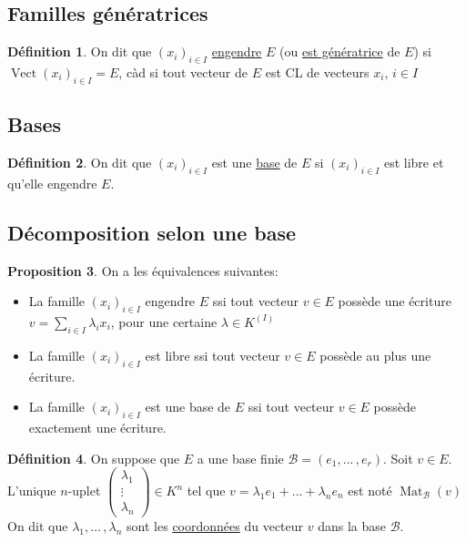 \documentclass[10pt,a4paper]{article}
\theoremstyle{definition}
\newtheorem{proposition}{Proposition}[section]
\newtheorem{definition}[proposition]{Définition}
\DeclareMathOperator{\vect}{Vect}
\DeclareMathOperator{\mat}{Mat}
\begin{document}
\subsection{Familles génératrices}
\begin{definition}
On dit que $(x_i)_{i \in I}$ \uline{engendre} $E$ (ou \uline{est génératrice} de $E$) si $\vect(x_i)_{i \in I} = E$, càd si tout vecteur de $E$ est CL de vecteurs $x_i,\, i \in I$
\end{definition}

\subsection{Bases}
\begin{definition}
On dit que $(x_i)_{i \in I}$ est une \uline{base} de $E$ si $(x_i)_{i \in I}$ est libre et qu'elle engendre $E$.
\end{definition}

\subsection{Décomposition selon une base}
\begin{proposition}
On a les équivalences suivantes:
\begin{itemize}
\item La famille $(x_i)_{i \in I}$ engendre $E$ ssi tout vecteur $v \in E$ possède une écriture $v = \sum\limits_{i \in I} \lambda_i x_i$, pour une certaine $\lambda \in K^{(I)}$
\item La famille $(x_i)_{i \in I}$ est libre ssi tout vecteur $v \in E$ possède au plus une écriture.
\item La famille $(x_i)_{i \in I}$ est une base de $E$ ssi tout vecteur $v \in E$ possède exactement une écriture.
\end{itemize}
\end{proposition}
\begin{definition}
On suppose que $E$ a une base finie $\mathcal{B} = (e_1, ...\, , e_r)$. Soit $v \in E$. \\
L'unique $n$-uplet $\begin{pmatrix}
\lambda_1 \\
\vdots \\
\lambda_n
\end{pmatrix} \in K^n$ tel que $v = \lambda_1 e_1 + ... + \lambda_n e_n$ est noté $\mat_\mathcal{B}(v)$ \\
On dit que $\lambda_1, ...\, , \lambda_n$ sont les \uline{coordonnées} du vecteur $v$ dans la base $\mathcal{B}$.
\end{definition}
\end{document}
